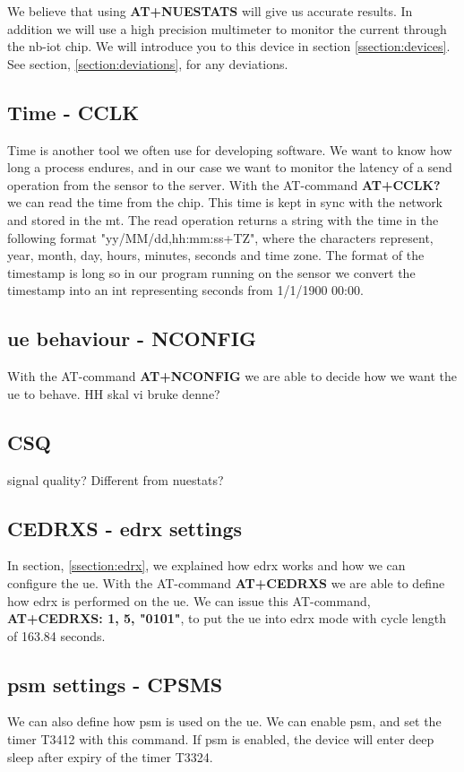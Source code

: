 \documentclass[USenglish]{ifimaster}  %
\begin{document}
We believe that using \textbf{AT+NUESTATS} will give us accurate results. In addition we will use a high precision multimeter to monitor the current through the \acrshort{nb-iot} chip. We will introduce you to this device in section \vref{ssection:devices}. See section, \vref{section:deviations}, for any deviations.

\subsection{Time - CCLK}
Time is another tool we often use for developing software. We want to know how long a process endures, and in our case we want to monitor the latency of a send operation from the sensor to the server. With the AT-command \textbf{AT+CCLK?} we can read the time from the chip. This time is kept in sync with the network and stored in the \acrshort{mt}. The read operation returns a string with the time in the following format "yy/MM/dd,hh:mm:ss+TZ", where the characters represent, year, month, day, hours, minutes, seconds and time zone. The format of the timestamp is long so in our program running on the sensor we convert the timestamp into an int representing seconds from 1/1/1900 00:00. %

\subsection{\acrshort{ue} behaviour - NCONFIG}
With the AT-command \textbf{AT+NCONFIG} we are able to decide how we want the \acrshort{ue} to behave. HH skal vi bruke denne?

\subsection{CSQ} signal quality? Different from nuestats?

\subsection{CEDRXS - \acrshort{edrx} settings}
In section, \vref{ssection:edrx}, we explained how \acrshort{edrx} works and how we can configure the \acrshort{ue}. With the AT-command \textbf{AT+CEDRXS} we are able to define how \acrshort{edrx} is performed on the \acrshort{ue}. We can issue this AT-command, \textbf{AT+CEDRXS: 1, 5, "0101"}, to put the \acrshort{ue} into \acrshort{edrx} mode with cycle length of 163.84 seconds.

\subsection{\acrshort{psm} settings - CPSMS}
We can also define how \acrshort{psm} is used on the \acrshort{ue}. We can enable \acrshort{psm}, and set the timer \acrfull{T3412} with this command. If \acrshort{psm} is enabled, the device will enter deep sleep after expiry of the timer \acrfull{T3324}.
\end{document}
